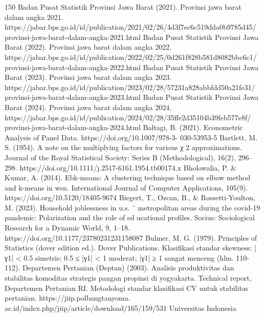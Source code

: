 150
Badan Pusat Statistik Provinsi Jawa Barat (2021). Provinsi jawa barat dalam angka
2021. https://jabar.bps.go.id/id/publication/2021/02/26/4d3f7ec6c519dda0b9785d45/
provinsi-jawa-barat-dalam-angka-2021.html
Badan Pusat Statistik Provinsi Jawa Barat (2022). Provinsi jawa barat dalam angka
2022. https://jabar.bps.go.id/id/publication/2022/02/25/0d261f828b581d8082bbc6c1/
provinsi-jawa-barat-dalam-angka-2022.html
Badan Pusat Statistik Provinsi Jawa Barat (2023). Provinsi jawa barat dalam angka
2023. https://jabar.bps.go.id/id/publication/2023/02/28/57231a828abbfdd50a21fe31/
provinsi-jawa-barat-dalam-angka-2023.html
Badan Pusat Statistik Provinsi Jawa Barat (2024). Provinsi jawa barat dalam angka
2024. https://jabar.bps.go.id/id/publication/2024/02/28/35ffe2d35104b39feb577e8f/
provinsi-jawa-barat-dalam-angka-2024.html
Baltagi, B. (2021). Econometric Analysis of Panel Data. https://doi.org/10.1007/978-3-
030-53953-5
Bartlett, M. S. (1954). A note on the multiplying factors for various χ
2
approximations.
Journal of the Royal Statistical Society: Series B (Methodological), 16(2), 296–298.
https://doi.org/10.1111/j.2517-6161.1954.tb00174.x
Bholowalia, P. & Kumar, A. (2014). Ebk-means: A clustering technique based on elbow
method and k-means in wsn. International Journal of Computer Applications, 105(9).
https://doi.org/10.5120/18405-9674
Biegert, T., Ozcan, B., & Rossetti-Youlton, M. (2023). Household joblessness in u.s. ¨
metropolitan areas during the covid-19 pandemic: Polarization and the role of educational profiles. Socius: Sociological Research for a Dynamic World, 9, 1–18.
https://doi.org/10.1177/23780231231158087
Bulmer, M. G. (1979). Principles of Statistics (dover edition ed.). Dover Publications.
Klasifikasi standar skewness: |γ1| < 0.5 simetris; 0.5 ≤ |γ1| < 1 moderat; |γ1| ≥ 1
sangat menceng (hlm. 110-112).
Departemen Pertanian (Deptan) (2003). Analisis produktivitas dan stabilitas komoditas
strategis pangan propinsi di yogyakarta. Technical report, Departemen Pertanian RI.
Metodologi standar klasifikasi CV untuk stabilitas pertanian. https://jiip.polbangtanyoma.
ac.id/index.php/jiip/article/download/165/159/531
Universitas Indonesia

